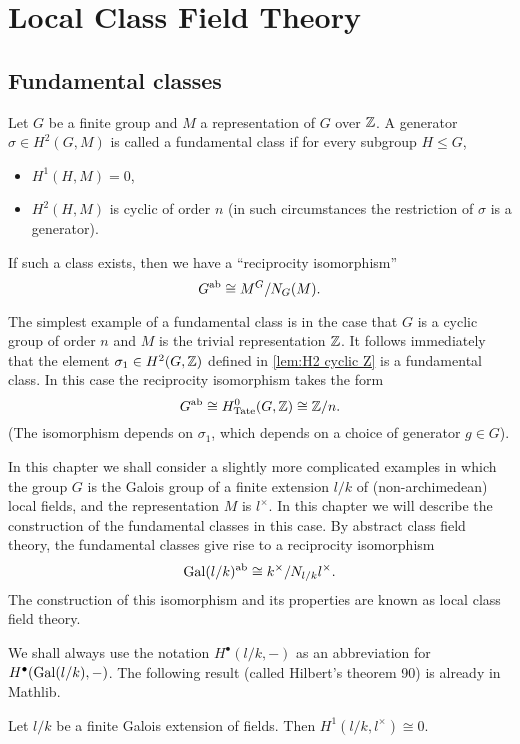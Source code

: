 \chapter{Local Class Field Theory}

\section{Fundamental classes}
Let $G$ be a finite group and $M$ a representation of $G$ over ${\mathbb Z}$.
A generator $\sigma \in H^2(G,M)$ is called a fundamental class if for every subgroup $H \le G$,
\begin{itemize}
	\item
	$H^1(H,M) = 0$,
	\item
	$H^2(H,M)$ is cyclic of order $n$
	(in such circumstances the restriction of $\sigma$ is a generator).
\end{itemize}
If such a class exists, then we have a ``reciprocity isomorphism''
\[
	G^{\mathrm{ab}} \cong M^G / N_G(M).
\]

The simplest example of a fundamental class is in the case
that $G$ is a cyclic group of order $n$ and $M$ is the trivial representation ${\mathbb Z}$.
It follows immediately that the element $\sigma_1 \in H^2(G,{\mathbb Z})$ defined in
\ref{lem:H2 cyclic Z} is a fundamental class.
In this case the reciprocity isomorphism takes the form
\[
	G^{\mathrm{ab}} \cong H^0_{\mathrm{Tate}} (G,{\mathbb Z}) \cong {\mathbb Z}/n.
\]
(The isomorphism depends on $\sigma_1$, which depends on a choice of generator $g \in G$).

In this chapter we shall consider a slightly more complicated examples in which the group $G$ is
the Galois group of a finite extension $l/k$ of (non-archimedean) local fields, and the
representation $M$ is $l^\times$.
In this chapter we will describe the construction of the fundamental classes in this case.
By abstract class field theory, the fundamental classes give rise to a reciprocity isomorphism
\[
	\mathrm{Gal}(l/k)^{\mathrm{ab}} \cong k^\times / N_{l/k} l^\times.
\]
The construction of this isomorphism and its properties are known as local class field theory.

We shall always use the notation $H^\bullet(l/k,-)$ as an abbreviation
for $H^\bullet(\mathrm{Gal}(l/k),-)$.
The following result (called Hilbert's theorem 90) is already in Mathlib.

\begin{theorem}\label{thm:hilbert 90}
	\mathlibok
	Let $l/k$ be a finite Galois extension of fields.
	Then $H^1(l/k, l^\times) \cong 0$.
\end{theorem}

